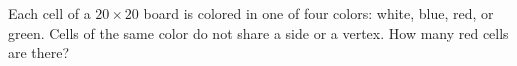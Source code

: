 Each cell of a $20\times20$ board is colored in one of four colors: white, blue, red, or green. Cells of the same color do not share a side or a vertex. How many red cells are there?
